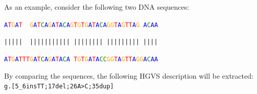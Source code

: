 \documentclass[final, slidestop]{beamer}
\begin{document}
\begin{frame}{}
\begin{myPoster}
{      \vspace{1cm}

      As an example, consider the following two DNA sequences:

      \vspace{1cm}

      \centerline{\texttt{\textcolor{blue}{A}\textcolor{red}{T}\textcolor{orange}{G}\textcolor{blue}{A}\textcolor{red}{T}~~\textcolor{orange}{G}\textcolor{blue}{A}\textcolor{red}{T}\textcolor{green}{C}\textcolor{blue}{A}\textcolor{orange}{G}\textcolor{blue}{A}\textcolor{red}{T}\textcolor{blue}{A}\textcolor{green}{C}\textcolor{blue}{A}\textcolor{orange}{G}\textcolor{red}{T}\textcolor{orange}{G}\textcolor{red}{T}\textcolor{orange}{G}\textcolor{blue}{A}\textcolor{red}{T}\textcolor{blue}{A}\textcolor{green}{C}\textcolor{blue}{A}\textcolor{orange}{G}\textcolor{orange}{G}\textcolor{red}{T}\textcolor{blue}{A}\textcolor{orange}{G}\textcolor{red}{T}\textcolor{red}{T}\textcolor{blue}{A}\textcolor{orange}{G}~\textcolor{blue}{A}\textcolor{green}{C}\textcolor{blue}{A}\textcolor{blue}{A}}}
      \centerline{\texttt{|||||~~|||||||||||~||||||||~|||||||||~||||}}
      \centerline{\texttt{\textcolor{blue}{A}\textcolor{red}{T}\textcolor{orange}{G}\textcolor{blue}{A}\textcolor{red}{T}\textcolor{red}{T}\textcolor{red}{T}\textcolor{orange}{G}\textcolor{blue}{A}\textcolor{red}{T}\textcolor{green}{C}\textcolor{blue}{A}\textcolor{orange}{G}\textcolor{blue}{A}\textcolor{red}{T}\textcolor{blue}{A}\textcolor{green}{C}\textcolor{blue}{A}~\textcolor{red}{T}\textcolor{orange}{G}\textcolor{red}{T}\textcolor{orange}{G}\textcolor{blue}{A}\textcolor{red}{T}\textcolor{blue}{A}\textcolor{green}{C}\textcolor{green}{C}\textcolor{orange}{G}\textcolor{orange}{G}\textcolor{red}{T}\textcolor{blue}{A}\textcolor{orange}{G}\textcolor{red}{T}\textcolor{red}{T}\textcolor{blue}{A}\textcolor{orange}{G}\textcolor{orange}{G}\textcolor{blue}{A}\textcolor{green}{C}\textcolor{blue}{A}\textcolor{blue}{A}}}

      \vspace{1cm}

      By comparing the sequences, the following HGVS description will be
      extracted: \texttt{g.[5\_6insTT;17del;26A>C;35dup]}

      \vspace{1cm}

}
\end{myPoster}
\end{frame}
\end{document}
